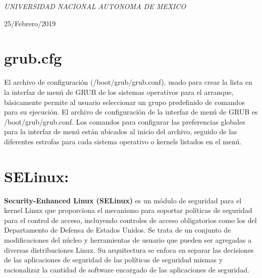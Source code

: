 \documentclass[a4paper, 11pt, oneside]{article}
\begin{document}
\begin{titlepage}
	\textit{UNIVERSIDAD NACIONAL AUTONOMA DE MEXICO} 
	
	\vfill
	
	
	
	
	\vspace{0.3\baselineskip} 
	
	25/Febrero/2019 
	
	 

\end{titlepage}

\section*{grub.cfg}
El archivo de configuración (/boot/grub/grub.conf), usado para crear la lista en la interfaz de menú de GRUB de los sistemas operativos para el arranque, básicamente permite al usuario seleccionar un grupo predefinido de comandos para su ejecución.
El archivo de configuración de la interfaz de menú de GRUB es /boot/grub/grub.conf. Los comandos para configurar las preferencias globales para la interfaz de menú están ubicados al inicio del archivo, seguido de las diferentes estrofas para cada sistema operativo o kernels listados en el menú.

\section*{SELinux:}

\textbf{Security-Enhanced Linux (SELinux)} es un módulo de seguridad para el kernel Linux que proporciona el mecanismo para soportar políticas de seguridad para el control de acceso, incluyendo controles de acceso obligatorios como los del Departamento de Defensa de Estados Unidos. Se trata de un conjunto de modificaciones del núcleo y herramientas de usuario que pueden ser agregadas a diversas distribuciones Linux. Su arquitectura se enfoca en separar las decisiones de las aplicaciones de seguridad de las políticas de seguridad mismas y racionalizar la cantidad de software encargado de las aplicaciones de seguridad.
\end{document}
